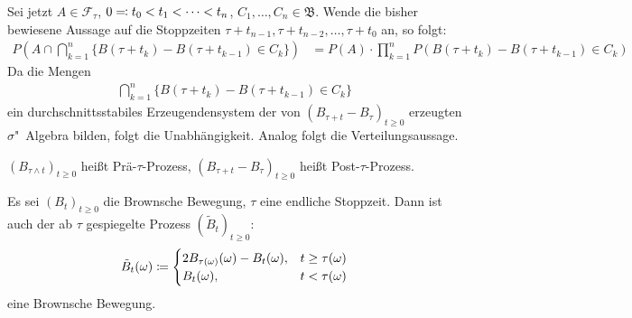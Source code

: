 \documentclass[a4paper,twoside,DIV15,BCOR12mm]{scrbook}
\newcommand{\cF}{\mathcal F}
\newcommand{\borel}{{\mathfrak B}}
\begin{document}
\begin{beweis}
Sei jetzt $A\in \cF_\tau$, $0\ad t_0 < t_1 <\cdots < t_n$, $C_1,\ldots,C_n\in \borel$. Wende die bisher bewiesene Aussage auf die Stoppzeiten $\tau + t_{n-1},\tau + t_{n-2},\ldots,\tau+t_0$ an, so folgt:
\begin{align*}
P(A\cap \bigcap_{k=1}^n \{B(\tau + t_k) - B(\tau +t_{k-1}) \in C_k\}) 
&=  P(A) \cdot \prod_{k=1}^nP(B(\tau+t_k) - B(\tau + t_{k-1}) \in C_k)
\end{align*}
Da die Mengen 
\begin{align*}
\bigcap_{k=1}^n \{B(\tau +t_k) - B(\tau +t_{k-1}) \in C_k\}
\end{align*}
ein durchschnittsstabiles Erzeugendensystem der von $(B_{\tau +t}-B_\tau)_{t\ge 0}$ erzeugten $\sigma$"~Algebra bilden, folgt die Unabhängigkeit. Analog folgt die Verteilungsaussage.
\end{beweis}

\begin{bemerkung}
$(B_{\tau \wedge t})_{t\ge 0}$ heißt Prä-$\tau$-Prozess, $(B_{\tau+t}-B_\tau)_{t\ge 0}$ heißt Post-$\tau$-Prozess.
\end{bemerkung}

\begin{satz}
\label{satz:13.3}
Es sei $(B_t)_{t\ge 0}$ die Brownsche Bewegung, $\tau$ eine endliche Stoppzeit. Dann ist auch der ab $\tau$ gespiegelte Prozess $(\tilde B_t)_{t\ge 0}$:
\begin{align*}
\tilde B_t(\omega) \da 
\begin{cases}
2B_{\tau (\omega)}(\omega)-B_t(\omega),& t\ge \tau(\omega) \\
B_t(\omega), & t< \tau(\omega)
\end{cases}
\end{align*}
eine Brownsche Bewegung.
\end{satz}

%
% 
% 
% 
\end{document}
